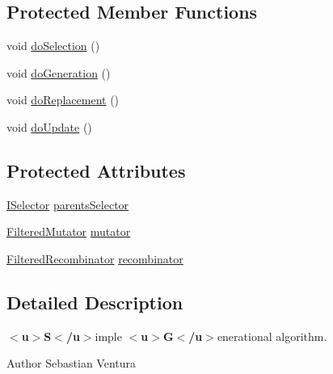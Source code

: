 \subsection*{Protected Member Functions}
\begin{DoxyCompactItemize}
\item 
void \hyperlink{classnet_1_1sf_1_1jclec_1_1algorithm_1_1classic_1_1_s_g_a611de84139debfc2a836308f6ab16eec}{do\-Selection} ()
\item 
void \hyperlink{classnet_1_1sf_1_1jclec_1_1algorithm_1_1classic_1_1_s_g_a7e4de8a9b4dcbec8bc4b7f9d4467aafd}{do\-Generation} ()
\item 
void \hyperlink{classnet_1_1sf_1_1jclec_1_1algorithm_1_1classic_1_1_s_g_ad320a6771edce4697b77b86a9b716fa2}{do\-Replacement} ()
\item 
void \hyperlink{classnet_1_1sf_1_1jclec_1_1algorithm_1_1classic_1_1_s_g_a3d948a919967ee8095ec90580e45e985}{do\-Update} ()
\end{DoxyCompactItemize}
\subsection*{Protected Attributes}
\begin{DoxyCompactItemize}
\item 
\hyperlink{interfacenet_1_1sf_1_1jclec_1_1_i_selector}{I\-Selector} \hyperlink{classnet_1_1sf_1_1jclec_1_1algorithm_1_1classic_1_1_s_g_aeb8173ace1e16d89028b97678822f603}{parents\-Selector}
\item 
\hyperlink{classnet_1_1sf_1_1jclec_1_1base_1_1_filtered_mutator}{Filtered\-Mutator} \hyperlink{classnet_1_1sf_1_1jclec_1_1algorithm_1_1classic_1_1_s_g_a09ed262ead4acffefd99566fbe645184}{mutator}
\item 
\hyperlink{classnet_1_1sf_1_1jclec_1_1base_1_1_filtered_recombinator}{Filtered\-Recombinator} \hyperlink{classnet_1_1sf_1_1jclec_1_1algorithm_1_1classic_1_1_s_g_a64b6a952a98acd9193bcb32852b84250}{recombinator}
\end{DoxyCompactItemize}


\subsection{Detailed Description}
{\bfseries $<$u$>$S$<$/u$>$}imple {\bfseries $<$u$>$G$<$/u$>$}enerational algorithm.

\begin{DoxyAuthor}{Author}
Sebastian Ventura 
\end{DoxyAuthor}


